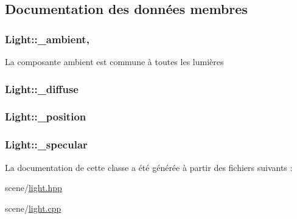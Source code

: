 \subsection{Documentation des données membres}
\hypertarget{class_light_ab139b739498b75944c99203027332ad9}{
\subsubsection[{\+\_\+ambient}]{ Light\+::\+\_\+ambient\hspace{0.3cm}{\ttfamily [static]}, {\ttfamily [private]}}}\label{class_light_ab139b739498b75944c99203027332ad9}
La composante ambient est commune à toutes les lumières \hypertarget{class_light_a32445f2054766ef532c29eb514b2599d}{
\subsubsection[{\+\_\+diffuse}]{ Light\+::\+\_\+diffuse\hspace{0.3cm}{\ttfamily [private]}}}\label{class_light_a32445f2054766ef532c29eb514b2599d}
\hypertarget{class_light_a3af8c823a869606782bd9e1872586b72}{
\subsubsection[{\+\_\+position}]{ Light\+::\+\_\+position\hspace{0.3cm}{\ttfamily [private]}}}\label{class_light_a3af8c823a869606782bd9e1872586b72}
\hypertarget{class_light_a36414dc1e8a75b36652bc5a12b2ea43d}{
\subsubsection[{\+\_\+specular}]{ Light\+::\+\_\+specular\hspace{0.3cm}{\ttfamily [private]}}}\label{class_light_a36414dc1e8a75b36652bc5a12b2ea43d}


La documentation de cette classe a été générée à partir des fichiers suivants \+:\begin{DoxyCompactItemize}
\item 
scene/\hyperlink{light_8hpp}{light.\+hpp}\item 
scene/\hyperlink{light_8cpp}{light.\+cpp}\end{DoxyCompactItemize}
